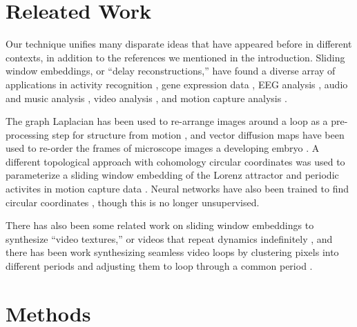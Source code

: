 \documentclass{article}
\begin{document}
\section{Releated Work}
Our technique unifies many disparate ideas that have appeared before in different contexts, in addition to the references we mentioned in the introduction.  Sliding window embeddings, or ``delay reconstructions,'' have found a diverse array of applications in activity recognition \cite{frank2010activity,venkataraman2016shape}, gene expression data \cite{perea2015sw1pers}, EEG analysis \cite{stam2005nonlinear, plesnik2014detection}, audio and music analysis \cite{herzel1994analysis,serra2009cross,bello2011measuring,traliemoebius}, video analysis \cite{schodl2000video, tralie2017quasi}, and motion capture analysis \cite{venkataraman2016shape}.

The graph Laplacian has been used to re-arrange images around a loop as a pre-processing step for structure from motion \cite{averbuch2015ringit}, and vector diffusion maps have been used to re-order the frames of microscope images a developing embryo \cite{dsilva2015diffusionvecordering}.  A different topological approach with cohomology circular coordinates\cite{de2011persistent} was used to parameterize a sliding window embedding of the Lorenz attractor \cite{de2012topological} and periodic activites in motion capture data \cite{vejdemo2015cohomological}.  Neural networks have also been trained to find circular coordinates \cite{levy2015live,anafi2017cyclops}, though this is no longer unsupervised.

There has also been some related work on sliding window embeddings to synthesize ``video textures,'' or videos that repeat dynamics indefinitely \cite{schodl2000video}, and there has been work synthesizing seamless video loops by clustering pixels into different periods and adjusting them to loop through a common period \cite{Liao2013VideoLoops,Liao2015VideoLoops}.



\section{Methods}
\label{sec:methods}
\end{document}
